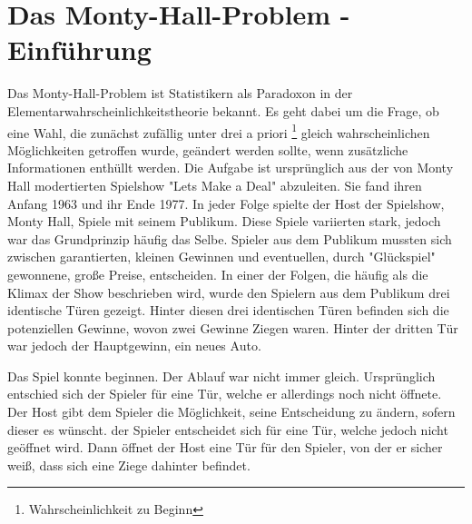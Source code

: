 
\chapter{Das Monty-Hall-Problem - Einführung}

Das Monty-Hall-Problem ist Statistikern als Paradoxon in der Elementarwahrscheinlichkeitstheorie bekannt. Es geht dabei um die Frage, ob eine Wahl, die zunächst 
zufällig unter drei a priori \footnote[1]{Wahrscheinlichkeit zu Beginn} gleich wahrscheinlichen Möglichkeiten getroffen wurde, geändert werden sollte, wenn zusätzliche 
Informationen enthüllt werden. Die Aufgabe ist ursprünglich aus der von Monty Hall modertierten Spielshow "Lets Make a Deal" abzuleiten. Sie fand ihren Anfang 
1963 und ihr Ende 1977. In jeder Folge spielte der Host der Spielshow, Monty Hall, Spiele mit seinem Publikum. Diese Spiele variierten stark, jedoch war das Grundprinzip
häufig das Selbe. Spieler aus dem Publikum mussten sich zwischen garantierten, kleinen Gewinnen und eventuellen, durch "Glückspiel" gewonnene, große Preise, entscheiden.
In einer der Folgen, die häufig als die Klimax der Show beschrieben wird, wurde den Spielern aus dem Publikum drei identische Türen gezeigt. Hinter diesen drei 
identischen Türen befinden sich die potenziellen Gewinne, wovon zwei Gewinne Ziegen waren. Hinter der dritten Tür war jedoch der Hauptgewinn, ein neues Auto.

Das Spiel konnte beginnen. Der Ablauf war nicht immer gleich. Ursprünglich entschied sich der Spieler für eine Tür, welche er allerdings noch nicht öffnete.
Der Host gibt dem Spieler die Möglichkeit, seine Entscheidung zu ändern, sofern dieser es wünscht. der Spieler entscheidet sich für eine Tür, welche jedoch nicht geöffnet wird. Dann öffnet der Host eine Tür für
den Spieler, von der er sicher weiß, dass sich eine Ziege dahinter befindet.







